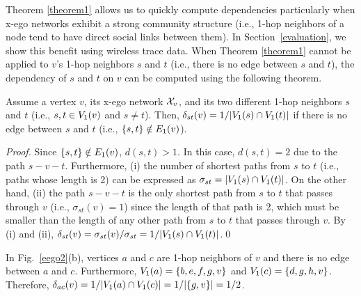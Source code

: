 % 
Theorem \ref{theorem1} allows us to quickly compute dependencies particularly when x-ego networks exhibit a strong community structure (i.e., 1-hop neighbors of a node tend to have direct social links between them).
In Section~\ref{evaluation}, we show this benefit using wireless trace data.
When Theorem \ref{theorem1} cannot be applied to $v$'s 1-hop neighbors $s$ and $t$ (i.e., there is no edge between $s$ and $t$), the dependency of $s$ and $t$ on $v$ can be computed using the following theorem.
\begin{theorem}
\label{theorem2} 
Assume a vertex $v$, its x-ego network $\XN{v}$, and its two different 1-hop neighbors $s$ and $t$ (i.e., $s, t \in \V{v}{1}$ and $s \ne t$).
Then, $\D{s}{t}{v} = {1}/{|\V{s}{1} \cap \V{t}{1}|}$ if there is no edge between $s$ and $t$ (i.e., $\{s, t\} \notin \E{v}{1}$).
\begin{proof}
Since $\{s, t\} \notin \E{v}{1}$, $d(s, t) > 1$.
In this case, $d(s, t) = 2$ due to the path $s - v - t$.
Furthermore, (i) the number of shortest paths from $s$ to $t$ (i.e., paths whose length is 2) can be expressed as $\sigma_{st} = |\V{s}{1} \cap \V{t}{1}|$.
On the other hand, (ii) the path $s-v-t$ is the only shortest path from $s$ to $t$ that passes through $v$ (i.e., $\sigma_{st}(v) = 1$) since the length of that path is 2, which must be smaller than the length of any other path from $s$ to $t$ that passes through $v$.
By (i) and (ii), $\D{s}{t}{v} = \sigma_{st}(v)/\sigma_{st} = {1}/{|\V{s}{1} \cap \V{t}{1}|}$.\hfill\qed
\end{proof}
\end{theorem}
\begin{example}
\label{example2} 
In Fig.~\ref{eego2}(b), vertices $a$ and $c$ are 1-hop neighbors of $v$ and there is no edge between $a$ and $c$.
Furthermore, $\V{a}{1} = \lbrace b, e, f, g, v\rbrace$ and $\V{c}{1} = \lbrace d, g, h, v\rbrace$.
Therefore, $\D{a}{c}{v}=1/|\V{a}{1} \cap \V{c}{1}|=1/|\{g, v \}|=1/2$.
\end{example}
